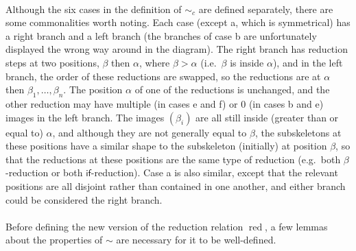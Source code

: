\documentclass{article}
\newcommand\set[1]{\{#1\}}
\newcommand\Leb{\mathrm{Leb}}
\DeclareMathOperator{\red}{red}
\theoremstyle{definition}
\theoremstyle{lemma}
\theoremstyle{remark}
\begin{document}
\paragraph{}
Although the six cases in the definition of $\sim_c$ are defined separately, there are some commonalities worth noting. Each case (except a, which is symmetrical) has a right branch and a left branch (the branches of case b are unfortunately displayed the wrong way around in the diagram). The right branch has reduction steps at two positions, $\beta$ then $\alpha$, where $\beta > \alpha$ (i.e.~$\beta$ is inside $\alpha$), and in the left branch, the order of these reductions are swapped, so the reductions are at $\alpha$ then $\beta_1, \dots, \beta_n$. The position $\alpha$ of one of the reductions is unchanged, and the other reduction may have multiple (in cases e and f) or 0 (in cases b and e) images in the left branch. The images $(\beta_i)$ are all still inside (greater than or equal to) $\alpha$, and although they are not generally equal to $\beta$, the subskeletons at these positions have a similar shape to the subskeleton (initially) at position $\beta$, so that the reductions at these positions are the same type of reduction (e.g.~both $\beta$-reduction or both $\textsf{if}$-reduction). Case a is also similar, except that the relevant positions are all disjoint rather than contained in one another, and either branch could be considered the right branch.

\iffalse
\changed[lo]{Since $L_s(M)$ is a countable set, there is a unique probability measure $\mu$ on the infinite product $\prod_{i \in L_s(M)} \Sigma_I$ of the Borel $\sigma$-algebras $\Sigma_I$ satisfying
\[
\mu\set{\omega \in \Omega \mid \omega_1 \in A_1, \cdots, \omega_n \in A_n} = \prod_{i=1}^n \Leb(A_i)
\]
where $\Leb$ is the Lebesgue measure on the measurable space $(I, \Sigma_I)$.}
\fi

\paragraph{}
Before defining the new version of the reduction relation $\red$, a few lemmas about the properties of $\sim$ are necessary for it to be well-defined.
\end{document}
